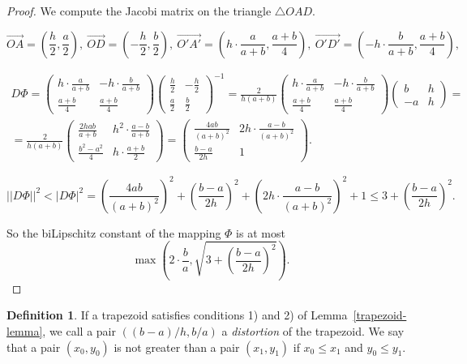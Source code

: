 \documentclass[12pt]{article}
\theoremstyle{definition}
\newtheorem{defi}[prop]{Definition}
\begin{document}
\begin{proof}
We compute the Jacobi matrix on the triangle $\triangle OAD.$ 

$$
\overrightarrow{OA} = \left(\frac{h}2, \frac{a}2\right),\ 
\overrightarrow{OD} = \left(-\frac{h}2, \frac{b}2\right),\ 
\overrightarrow{O'A'} = \left(h\cdot\frac{a}{a+b}, \frac{a+b}4\right),\ 
\overrightarrow{O'D'} = \left(-h\cdot\frac{b}{a+b}, \frac{a+b}4\right),
$$

\begin{multline*}
D\Phi = 
\begin{pmatrix}
h\cdot\frac{a}{a+b} & -h\cdot\frac{b}{a+b}\\
\frac{a+b}4 & \frac{a+b}4
\end{pmatrix}
\begin{pmatrix}
\frac{h}2 & -\frac{h}2\\
\frac{a}2 & \frac{b}2
\end{pmatrix}^{-1}
=
\frac{2}{h(a+b)}
\begin{pmatrix}
h\cdot\frac{a}{a+b} & -h\cdot\frac{b}{a+b}\\
\frac{a+b}4 & \frac{a+b}4
\end{pmatrix}
\begin{pmatrix}
b & h\\
-a & h
\end{pmatrix}
= \\ =
\frac{2}{h(a+b)}
\begin{pmatrix}
\frac{2hab}{a+b} & h^2\cdot\frac{a-b}{a+b}\\
\frac{b^2-a^2}4 & h\cdot\frac{a+b}2
\end{pmatrix}
=
\begin{pmatrix}
\frac{4ab}{(a+b)^2} & 2h\cdot\frac{a-b}{(a+b)^2}\\
\frac{b-a}{2h} & 1
\end{pmatrix}.
\end{multline*}

$$
||D\Phi||^2 < |D\Phi|^2 = \left(\frac{4ab}{(a+b)^2}\right)^2 + \left(\frac{b-a}{2h}\right)^2 + \left(2h\cdot\frac{a-b}{(a+b)^2}\right)^2 + 1 \le 3 + \left(\frac{b-a}{2h}\right)^2.
$$

So the biLipschitz constant of the mapping $\Phi$ is at most
$$
\max\left(
2\cdot\frac{b}{a},
\sqrt{3 + \left(\frac{b-a}{2h}\right)^2}
\right).
$$

\end{proof}

\begin{defi}
If a trapezoid satisfies conditions 1) and 2) of Lemma~\ref{trapezoid-lemma}, we call a pair $((b-a)/h, b/a)$ a {\it distortion} of the trapezoid. We say that a pair $(x_0, y_0)$ is not greater than a pair $(x_1, y_1)$ if $x_0\le x_1$ and $y_0\le y_1.$
\end{defi}
\end{document}
